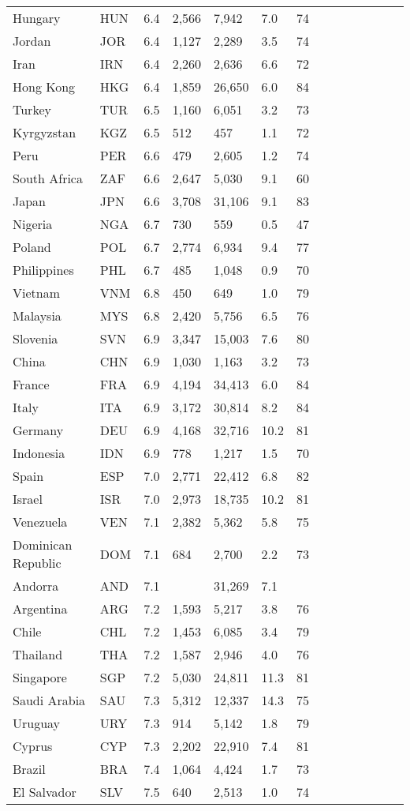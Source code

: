 \begin{scriptsize}
\begin{center}
\begin{longtable}{llllllllllllll}
Hungary&HUN&6.4&2,566&7,942&7.0&74\\
Jordan&JOR&6.4&1,127&2,289&3.5&74\\
Iran&IRN&6.4&2,260&2,636&6.6&72\\
Hong Kong&HKG&6.4&1,859&26,650&6.0&84\\
Turkey&TUR&6.5&1,160&6,051&3.2&73\\
Kyrgyzstan&KGZ&6.5&512&457&1.1&72\\
Peru&PER&6.6&479&2,605&1.2&74\\
South Africa&ZAF&6.6&2,647&5,030&9.1&60\\
Japan&JPN&6.6&3,708&31,106&9.1&83\\
Nigeria&NGA&6.7&730&559&0.5&47\\
Poland&POL&6.7&2,774&6,934&9.4&77\\
Philippines&PHL&6.7&485&1,048&0.9&70\\
Vietnam&VNM&6.8&450&649&1.0&79\\
Malaysia&MYS&6.8&2,420&5,756&6.5&76\\
Slovenia&SVN&6.9&3,347&15,003&7.6&80\\
China&CHN&6.9&1,030&1,163&3.2&73\\
France&FRA&6.9&4,194&34,413&6.0&84\\
Italy&ITA&6.9&3,172&30,814&8.2&84\\
Germany&DEU&6.9&4,168&32,716&10.2&81\\
Indonesia&IDN&6.9&778&1,217&1.5&70\\
Spain&ESP&7.0&2,771&22,412&6.8&82\\
Israel&ISR&7.0&2,973&18,735&10.2&81\\
Venezuela&VEN&7.1&2,382&5,362&5.8&75\\
Dominican Republic&DOM&7.1&684&2,700&2.2&73\\
Andorra&AND&7.1&&31,269&7.1&\\
Argentina&ARG&7.2&1,593&5,217&3.8&76\\
Chile&CHL&7.2&1,453&6,085&3.4&79\\
Thailand&THA&7.2&1,587&2,946&4.0&76\\
Singapore&SGP&7.2&5,030&24,811&11.3&81\\
Saudi Arabia&SAU&7.3&5,312&12,337&14.3&75\\
Uruguay&URY&7.3&914&5,142&1.8&79\\
Cyprus&CYP&7.3&2,202&22,910&7.4&81\\
Brazil&BRA&7.4&1,064&4,424&1.7&73\\
El Salvador&SLV&7.5&640&2,513&1.0&74\\

\end{longtable}
\end{center}
\end{scriptsize}
